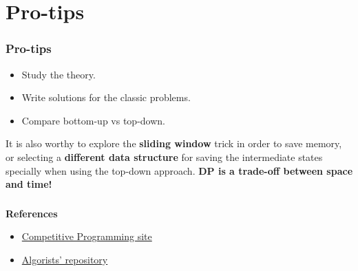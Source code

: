 \documentclass[article]{beamer}
\begin{document}
\section{Pro-tips}
\begin{frame}
	\frametitle{Pro-tips}
	\begin{itemize}
		\item Study the theory.
		\item Write solutions for the classic problems.
		\item Compare bottom-up vs top-down.
	\end{itemize}
	
	\vspace{5mm}
	
	It is also worthy to explore the \textbf{sliding window} trick in order to save memory, or selecting a \textbf{different data structure} for saving the intermediate states specially when using the top-down approach. \textbf{DP is a trade-off between space and time!}
\end{frame}

\begin{frame}[plain]
\frametitle{}
\begin{center}
\Huge{\color{blue}{Q \& A}}
\end{center}
\end{frame}

\begin{frame}[plain]
	\textbf{References}
	\begin{itemize}
		\item \href{https://sites.google.com/site/stevenhalim/}{Competitive Programming site}
		\item \href{https://github.com/davidjacobo/algorists/}{Algorists' repository}
	\end{itemize}
\end{frame}
\end{document}
